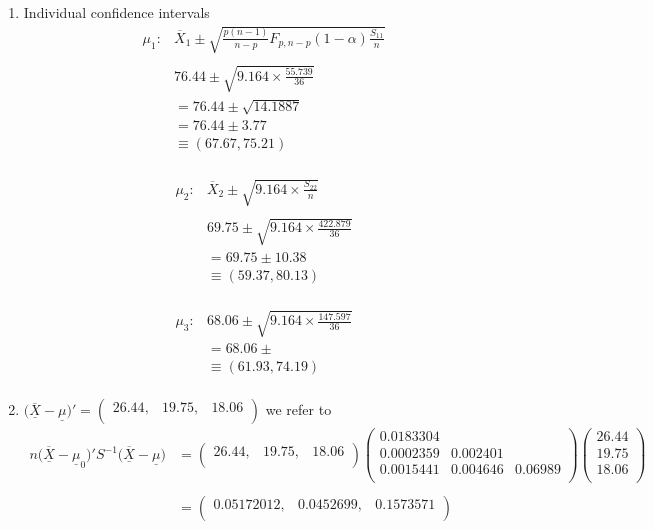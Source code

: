 \documentclass[11pt,a4paper]{article}
\theoremstyle{definition}
\begin{document}
\begin{enumerate}
\item Individual confidence intervals
\begin{align*}
\mu_1: & \overline{X}_1 \pm \sqrt{\frac{p(n-1)}{n-p}F_{p,n-p}(1-\alpha)\frac{S_{11}}{n}}\\\\
      & 76.44 \pm \sqrt{9.164 \times \frac{55.739}{36}}\\
      & = 76.44 \pm \sqrt{14.1887}\\
      & = 76.44 \pm 3.77\\
      & \equiv (67.67, 75.21)\\ 
\end{align*}


\begin{align*}
\mu_2 : & \overline{X}_2 \pm \sqrt{9.164 \times \frac{S_{22}}{n}}\\\\
& 69.75 \pm \sqrt{9.164 \times \frac{422.879}{36}}\\
& = 69.75\pm 10.38\\
& \equiv (59.37, 80.13)\\
\end{align*}

\begin{align*}
\mu_3 :& 68.06 \pm \sqrt{9.164 \times \frac{147.597}{36}}\\
 & = 68.06 \pm \\
 & \equiv (61.93, 74.19)\\
\end{align*}


\item $\big(\overline{\underline{X}}-\underline{\mu}\big)'= \begin{pmatrix}
26.44, & 19.75, & 18.06\\
\end{pmatrix}
$ we refer to 
\begin{align*}
n\big(\overline{\underline{X}}-\underline{\mu}_0\big)'S^{-1}\big(\overline{\underline{X}}-\underline{\mu}\big) & = \begin{pmatrix}
26.44  , & 19.75 , & 18.06\\
\end{pmatrix}
\begin{pmatrix}
0.0183304 &  & \\
0.0002359 & 0.002401 & \\
0.0015441 & 0.004646 & 0.06989\\
\end{pmatrix}
\begin{pmatrix}
26.44\\  19.75\\ 18.06\\
\end{pmatrix}\\\\
& = \begin{pmatrix}
0.05172012, & 0.0452699, & 0.1573571\\
\end{pmatrix}\\
\end{align*}



\end{enumerate}
\end{document}
